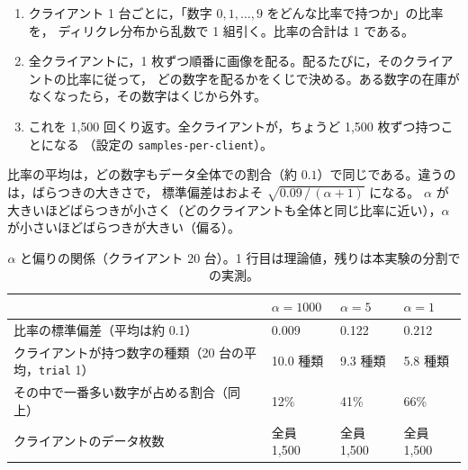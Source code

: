 \documentclass[a4j, dvipdfmx]{jsarticle}  %
\begin{document}
\begin{enumerate}
  \item クライアント 1 台ごとに，「数字 $0, 1, \dots, 9$ をどんな比率で持つか」の比率を，
        ディリクレ分布から乱数で 1 組引く。比率の合計は 1 である。
  \item 全クライアントに，1 枚ずつ順番に画像を配る。配るたびに，そのクライアントの比率に従って，
        どの数字を配るかをくじで決める。ある数字の在庫がなくなったら，その数字はくじから外す。
  \item これを 1{,}500 回くり返す。全クライアントが，ちょうど 1{,}500 枚ずつ持つことになる
        （設定の \texttt{samples-per-client}）。
\end{enumerate}

比率の平均は，どの数字もデータ全体での割合（約 $0.1$）で同じである。違うのは，ばらつきの大きさで，
標準偏差はおよそ $\sqrt{0.09\,/\,(\alpha + 1)}$ になる。
$\alpha$ が大きいほどばらつきが小さく（どのクライアントも全体と同じ比率に近い），$\alpha$ が小さいほどばらつきが大きい（偏る）。

\begin{table}[H]
\centering
\caption{$\alpha$ と偏りの関係（クライアント 20 台）。1 行目は理論値，残りは本実験の分割での実測。}
\label{tab:alpha}
\begin{tabular}{@{}P{7.4cm} P{2.3cm} P{2.3cm} P{2.3cm}@{}}
\toprule
 & $\alpha = 1000$ & $\alpha = 5$ & $\alpha = 1$ \\
\midrule
比率の標準偏差（平均は約 0.1） & 0.009 & 0.122 & 0.212 \\
\midrule
クライアントが持つ数字の種類（20 台の平均，\texttt{trial} 1） & 10.0 種類 & 9.3 種類 & 5.8 種類 \\
その中で一番多い数字が占める割合（同上） & 12\% & 41\% & 66\% \\
クライアントのデータ枚数 & 全員 1{,}500 & 全員 1{,}500 & 全員 1{,}500 \\
\bottomrule
\end{tabular}
\end{table}
\end{document}
